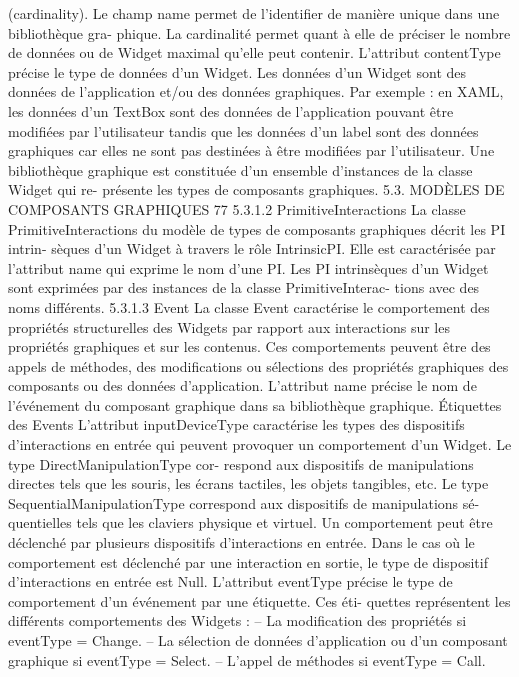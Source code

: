 \documentclass{article}
\begin{document}
(cardinality). Le champ name permet de l’identiﬁer de manière unique dans une bibliothèque gra-
phique. La cardinalité permet quant à elle de préciser le nombre de données ou de Widget maximal
qu’elle peut contenir.
L’attribut contentType précise le type de données d’un Widget. Les données d’un Widget sont
des données de l’application et/ou des données graphiques. Par exemple : en XAML, les données
d’un TextBox sont des données de l’application pouvant être modiﬁées par l’utilisateur tandis que les
données d’un label sont des données graphiques car elles ne sont pas destinées à être modiﬁées par
l’utilisateur.
Une bibliothèque graphique est constituée d’un ensemble d’instances de la classe Widget qui re-
présente les types de composants graphiques.
5.3. MODÈLES DE COMPOSANTS GRAPHIQUES
77
5.3.1.2
PrimitiveInteractions
La classe PrimitiveInteractions du modèle de types de composants graphiques décrit les PI intrin-
sèques d’un Widget à travers le rôle IntrinsicPI. Elle est caractérisée par l’attribut name qui exprime
le nom d’une PI.
Les PI intrinsèques d’un Widget sont exprimées par des instances de la classe PrimitiveInterac-
tions avec des noms différents.
5.3.1.3
Event
La classe Event caractérise le comportement des propriétés structurelles des Widgets par rapport
aux interactions sur les propriétés graphiques et sur les contenus. Ces comportements peuvent être des
appels de méthodes, des modiﬁcations ou sélections des propriétés graphiques des composants ou des
données d’application. L’attribut name précise le nom de l’événement du composant graphique dans
sa bibliothèque graphique.
Étiquettes des Events
L’attribut inputDeviceType caractérise les types des dispositifs d’interactions
en entrée qui peuvent provoquer un comportement d’un Widget. Le type DirectManipulationType cor-
respond aux dispositifs de manipulations directes tels que les souris, les écrans tactiles, les objets
tangibles, etc. Le type SequentialManipulationType correspond aux dispositifs de manipulations sé-
quentielles tels que les claviers physique et virtuel. Un comportement peut être déclenché par plusieurs
dispositifs d’interactions en entrée. Dans le cas où le comportement est déclenché par une interaction
en sortie, le type de dispositif d’interactions en entrée est Null.
L’attribut eventType précise le type de comportement d’un événement par une étiquette. Ces éti-
quettes représentent les différents comportements des Widgets :
– La modiﬁcation des propriétés si eventType = Change.
– La sélection de données d’application ou d’un composant graphique si eventType = Select.
– L’appel de méthodes si eventType = Call.
\end{document}
